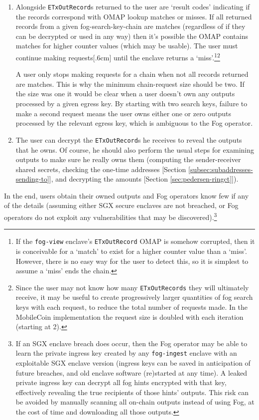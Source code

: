 \begin{enumerate}
    \item Alongside {\tt ETxOutRecord}s returned to the user are `result codes' indicating if the records correspond with OMAP lookup matches or misses. If all returned records from a given fog-search-key-chain are matches (regardless of if they can be decrypted or used in any way) then it's possible the OMAP contains matches for higher counter values (which may be usable). The user must continue making requests[.6cm] until the enclave returns a `miss'.\footnote{If the {\tt fog-view} enclave's {\tt ETxOutRecord} OMAP is somehow corrupted, then it is conceivable for a `match' to exist for a higher counter value than a `miss'. However, there is no easy way for the user to detect this, so it is simplest to assume a `miss' ends the chain.}\footnote{Since the user may not know how many {\tt ETxOutRecords} they will ultimately receive, it may be useful to create progressively larger quantities of fog search keys with each request, to reduce the total number of requests made. In the MobileCoin implementation the request size is doubled with each iteration (starting at 2).}

    A user only stops making requests for a chain when not all records returned are matches. This is why the minimum chain-request size should be two. If the size was one it would be clear when a user doesn't own any outputs processed by a given egress key. By starting with two search keys, failure to make a second request means the user owns either one or zero outputs processed by the relevant egress key, which is ambiguous to the Fog operator.

    \item The user can decrypt the {\tt ETxOutRecord}s he receives to reveal the outputs that he owns. Of course, he should also perform the usual steps for examining outputs to make sure he really owns them (computing the sender-receiver shared secrets, checking the one-time addresses [Section \ref{subsec:subaddresses-sending-to}], and decrypting the amounts [Section \ref{sec:pedersen-ringct}]).
\end{enumerate}

In the end, users obtain their owned outputs and Fog operators know few if any of the details (assuming either SGX secure enclaves are not breached, or Fog operators do not exploit any vulnerabilities that may be discovered).\footnote{If an SGX enclave breach does occur, then the Fog operator may be able to learn the private ingress key created by any {\tt fog-ingest} enclave with an exploitable SGX enclave version (ingress keys can be saved in anticipation of future breaches, and old enclave software (re)started at any time). A leaked private ingress key can decrypt all fog hints encrypted with that key, effectively revealing the true recipients of those hints' outputs. This risk can be avoided by manually scanning all on-chain outputs instead of using Fog, at the cost of time and downloading all those outputs.}



